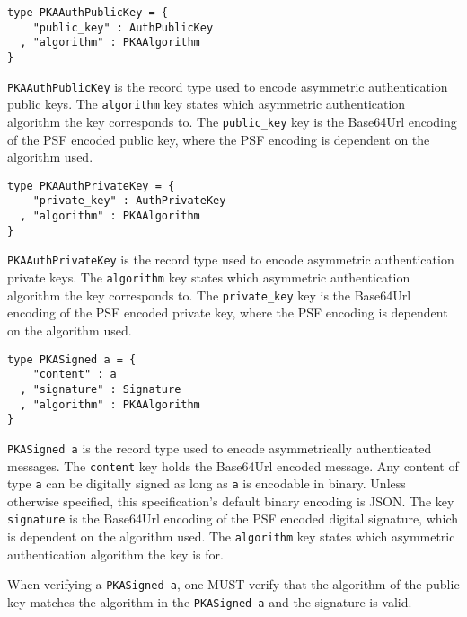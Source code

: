 \documentclass{article}
\begin{document}
\begin{lstlisting}
type PKAAuthPublicKey = {
    "public_key" : AuthPublicKey
  , "algorithm" : PKAAlgorithm
}
\end{lstlisting}

\texttt{PKAAuthPublicKey} is the record type used to encode asymmetric authentication public keys. 
The \texttt{algorithm} key states which asymmetric authentication algorithm the key corresponds to. 
The \texttt{public\_key} key is the Base64Url encoding of the PSF encoded public key, where the PSF encoding is dependent on the algorithm used. 

\begin{lstlisting}
type PKAAuthPrivateKey = {
    "private_key" : AuthPrivateKey
  , "algorithm" : PKAAlgorithm
}
\end{lstlisting}

\texttt{PKAAuthPrivateKey} is the record type used to encode asymmetric authentication private keys. 
The \texttt{algorithm} key states which asymmetric authentication algorithm the key corresponds to. 
The \texttt{private\_key} key is the Base64Url encoding of the PSF encoded private key, where the PSF encoding is dependent on the algorithm used. 

\begin{lstlisting}
type PKASigned a = {
    "content" : a
  , "signature" : Signature
  , "algorithm" : PKAAlgorithm
}
\end{lstlisting}

\texttt{PKASigned a} is the record type used to encode asymmetrically authenticated messages. 
The \texttt{content} key holds the Base64Url encoded message. 
Any content of type \texttt{a} can be digitally signed as long as \texttt{a} is encodable in binary. 
Unless otherwise specified, this specification's default binary encoding is JSON. 
The key \texttt{signature} is the Base64Url encoding of the PSF encoded digital signature, which is dependent on the algorithm used.  
The \texttt{algorithm} key states which asymmetric authentication algorithm the key is for. 

When verifying a \texttt{PKASigned a}, one MUST verify that the algorithm of the public key matches the algorithm in the \texttt{PKASigned a}
and the signature is valid. 
\end{document}
